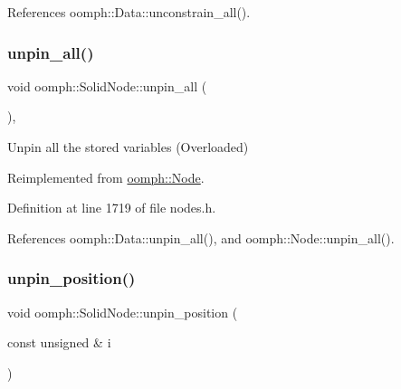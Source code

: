 References oomph\+::\+Data\+::unconstrain\+\_\+all().

\mbox{\label{classoomph_1_1SolidNode_a0df372aae692d679cfceeb46fb5783a9}} 
\subsubsection{\texorpdfstring{unpin\+\_\+all()}{unpin\_all()}}
{\footnotesize\ttfamily void oomph\+::\+Solid\+Node\+::unpin\+\_\+all (\begin{DoxyParamCaption}{ }\end{DoxyParamCaption})\hspace{0.3cm}{\ttfamily [inline]}, {\ttfamily [virtual]}}



Unpin all the stored variables (Overloaded) 



Reimplemented from \hyperlink{classoomph_1_1Node_a8ef38470acf00f344c9567bcc9cbd000}{oomph\+::\+Node}.



Definition at line 1719 of file nodes.\+h.



References oomph\+::\+Data\+::unpin\+\_\+all(), and oomph\+::\+Node\+::unpin\+\_\+all().

\mbox{\label{classoomph_1_1SolidNode_ab43707b1893ca89e684609f045ea8101}} 
\subsubsection{\texorpdfstring{unpin\+\_\+position()}{unpin\_position()}\hspace{0.1cm}{\footnotesize\ttfamily [1/2]}}
{\footnotesize\ttfamily void oomph\+::\+Solid\+Node\+::unpin\+\_\+position (\begin{DoxyParamCaption}\item[{const unsigned \&}]{i }\end{DoxyParamCaption})\hspace{0.3cm}{\ttfamily [inline]}}



